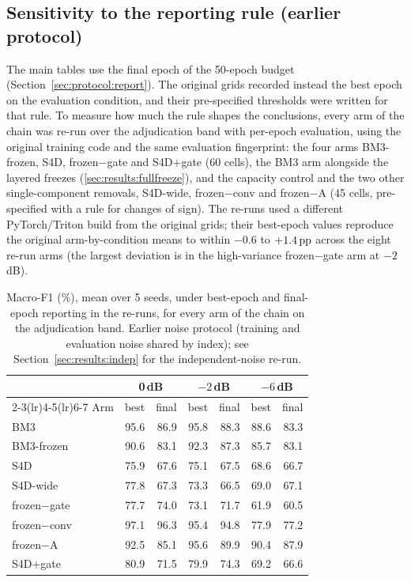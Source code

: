 \subsection{Sensitivity to the reporting rule (earlier protocol)}
\label{sec:results:sensitivity}

The main tables use the final epoch of the 50-epoch budget (Section~\ref{sec:protocol:report}). The original grids recorded instead the best epoch on the evaluation condition, and their pre-specified thresholds were written for that rule. To measure how much the rule shapes the conclusions, every arm of the chain was re-run over the adjudication band with per-epoch evaluation, using the original training code and the same evaluation fingerprint: the four arms BM3-frozen, S4D, frozen$-$gate and S4D+gate (60 cells), the BM3 arm alongside the layered freezes (\ref{sec:results:fullfreeze}), and the capacity control and the two other single-component removals, S4D-wide, frozen$-$conv and frozen$-$A (45 cells, pre-specified with a rule for changes of sign). The re-runs used a different PyTorch/Triton build from the original grids; their best-epoch values reproduce the original arm-by-condition means to within $-0.6$ to $+1.4\,\mathrm{pp}$ across the eight re-run arms (the largest deviation is in the high-variance frozen$-$gate arm at $-2$\,dB).

\begin{table}[htbp]
\centering
\caption{Macro-F1 (\%), mean over 5 seeds, under best-epoch and final-epoch reporting in the re-runs, for every arm of the chain on the adjudication band. Earlier noise protocol (training and evaluation noise shared by index); see Section~\ref{sec:results:indep} for the independent-noise re-run.}
\label{tab:sensitivity_means}
\begin{tabular}{@{}lrrrrrr@{}}
\toprule
 & \multicolumn{2}{c}{0\,dB} & \multicolumn{2}{c}{$-2$\,dB} & \multicolumn{2}{c}{$-6$\,dB} \\
\cmidrule(lr){2-3}\cmidrule(lr){4-5}\cmidrule(lr){6-7}
Arm & best & final & best & final & best & final \\
\midrule
BM3 & 95.6 & 86.9 & 95.8 & 88.3 & 88.6 & 83.3 \\
BM3-frozen & 90.6 & 83.1 & 92.3 & 87.3 & 85.7 & 83.1 \\
S4D & 75.9 & 67.6 & 75.1 & 67.5 & 68.6 & 66.7 \\
S4D-wide & 77.8 & 67.3 & 73.3 & 66.5 & 69.0 & 67.1 \\
frozen$-$gate & 77.7 & 74.0 & 73.1 & 71.7 & 61.9 & 60.5 \\
frozen$-$conv & 97.1 & 96.3 & 95.4 & 94.8 & 77.9 & 77.2 \\
frozen$-$A & 92.5 & 85.1 & 95.6 & 89.9 & 90.4 & 87.9 \\
S4D+gate & 80.9 & 71.5 & 79.9 & 74.3 & 69.2 & 66.6 \\
\bottomrule
\end{tabular}
\end{table}

